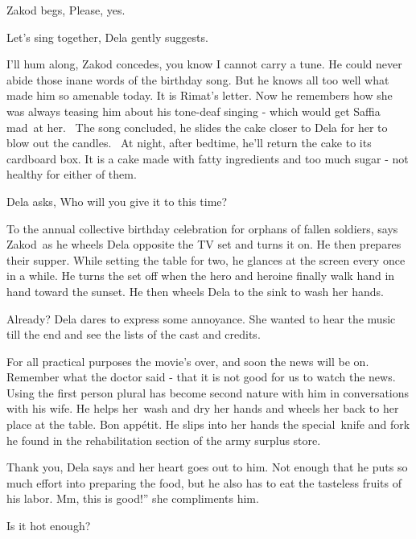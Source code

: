 \documentclass[twoside,11pt]{book}
\begin{document}
Zakod begs, {\textquotedbl}Please, yes.{\textquotedbl} 

{\textquotedbl}Let's sing together,{\textquotedbl} Dela gently suggests. 

{\textquotedbl}I'll hum along,{\textquotedbl} Zakod concedes, {\textquotedbl}you know I cannot carry a
tune.{\textquotedbl} He could never abide those inane words of the birthday song. But he knows all too well what made
him so amenable today. It is Rimat's letter. Now he remembers how she was always teasing him about his tone-deaf
singing - which would get Saffia mad\ at her. \ The song concluded, he slides the cake closer to Dela for her to blow
out the candles. \ At night, after bedtime, he'll return the cake to its cardboard box. It is a cake made with fatty
ingredients and too much sugar - not healthy for either of them.

Dela asks, {\textquotedbl}Who will you give it to this time?{\textquotedbl} 

{\textquotedbl}To the annual collective birthday celebration for orphans of fallen soldiers,{\textquotedbl} says
Zakod~as he wheels Dela opposite the TV set and turns it on. He then prepares their supper. While setting the table for
two, he glances at the screen every once in a while. He turns the set off when the hero and heroine finally walk hand
in hand toward the sunset. He then wheels Dela to the sink to wash her hands.\ \ 

{\textquotedbl}Already?{\textquotedbl} Dela dares to express some annoyance. She wanted to hear the music till the end
and see the lists of the cast and credits. 

{\textquotedbl}For all practical purposes the movie's over, and soon the news will be on. Remember what the doctor said
- that it is not good for us to watch the news.{\textquotedbl} Using the first person plural has become second nature
with him in conversations with his wife. He helps her~wash and dry her hands and wheels her back to her place at the
table. {\textquotedbl}Bon app\'etit.{\textquotedbl} He slips into her hands the special~knife and fork he found in the
rehabilitation section of the army surplus store. 

{\textquotedbl}Thank you,{\textquotedbl} Dela says and her heart goes out to him. Not enough that he puts so much effort
into preparing the food, but he also has to eat the tasteless fruits of his labor. {\textquotedbl}Mm, this is good!''
she compliments him. 

{\textquotedbl}Is it hot enough?{\textquotedbl} 
\end{document}
